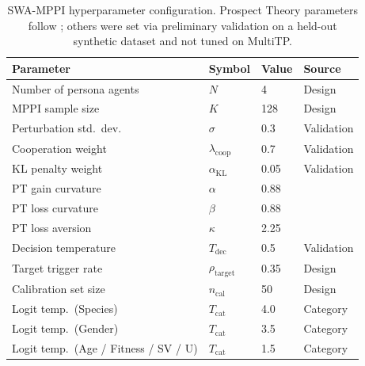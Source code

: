 \documentclass{article}
\begin{document}
\begin{table}[t]
\caption{SWA-MPPI hyperparameter configuration. Prospect Theory parameters follow
\citet{kahneman1979prospect}; others were set via preliminary validation on a held-out
synthetic dataset and not tuned on MultiTP.}
\label{tab:hyperparams}
\centering
\begin{tabular}{llll}
\toprule
Parameter                             & Symbol                     & Value   & Source \\
\midrule
Number of persona agents              & $N$                        & 4       & Design \\
MPPI sample size                      & $K$                        & 128     & Design \\
Perturbation std.\ dev.\              & $\sigma$                   & 0.3     & Validation \\
Cooperation weight                    & $\lambda_{\text{coop}}$    & 0.7     & Validation \\
KL penalty weight                     & $\alpha_{\text{KL}}$       & 0.05    & Validation \\
PT gain curvature                     & $\alpha$                   & 0.88    & \citet{kahneman1979prospect} \\
PT loss curvature                     & $\beta$                    & 0.88    & \citet{kahneman1979prospect} \\
PT loss aversion                      & $\kappa$                   & 2.25    & \citet{kahneman1979prospect} \\
Decision temperature                  & $T_{\text{dec}}$           & 0.5     & Validation \\
Target trigger rate                   & $\rho_{\text{target}}$     & 0.35    & Design \\
Calibration set size                  & $n_{\text{cal}}$           & 50      & Design \\
Logit temp.\ (Species)                & $T_{\text{cat}}$           & 4.0     & Category \\
Logit temp.\ (Gender)                 & $T_{\text{cat}}$           & 3.5     & Category \\
Logit temp.\ (Age / Fitness / SV / U) & $T_{\text{cat}}$           & 1.5     & Category \\
\bottomrule
\end{tabular}
\end{table}

\end{document}
